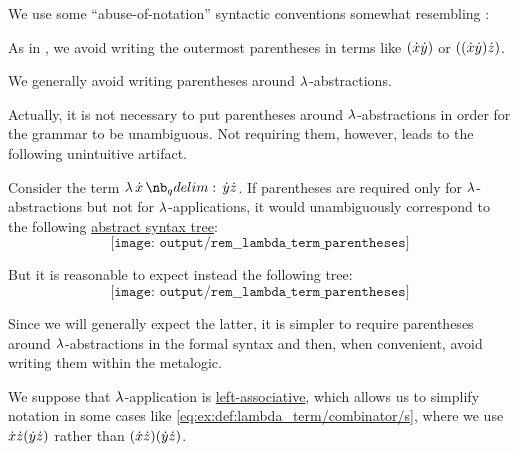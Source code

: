 \begin{remark}\label{rem:lambda_term_parentheses}
  We use some \enquote{abuse-of-notation} syntactic conventions somewhat resembling :
  \begin{thmenum}
     As in , we avoid writing the outermost parentheses in terms like \( ({\dot{x}} {\dot{y}}) \) or \( (({\dot{x}} {\dot{y}}) {\dot{z}}) \).

     We generally avoid writing parentheses around \( \mathrm{\lambda} \)-abstractions.

    Actually, it is not necessary to put parentheses around \( \mathrm{\lambda} \)-abstractions in order for the grammar to be unambiguous. Not requiring them, however, leads to the following unintuitive artifact.

    Consider the term \( \qabs \synx \syny \synz \). If parentheses are required only for \( \mathrm{\lambda} \)-abstractions but not for \( \mathrm{\lambda} \)-applications, it would unambiguously correspond to the following \hyperref[def:lambda_term_ast]{abstract syntax tree}:
    \begin{equation*}
      \texttt{[image: output/rem\_\_lambda\_term\_parentheses]}
    \end{equation*}

    But it is reasonable to expect instead the following tree:
    \begin{equation*}
      \texttt{[image: output/rem\_\_lambda\_term\_parentheses]}
    \end{equation*}

    Since we will generally expect the latter, it is simpler to require parentheses around \( \mathrm{\lambda} \)-abstractions in the formal syntax and then, when convenient, avoid writing them within the metalogic.

     We suppose that \( \mathrm{\lambda} \)-application is \hyperref[rem:binary_operation_syntax_trees/associativity]{left-associative}, which allows us to simplify notation in some cases like \eqref{eq:ex:def:lambda_term/combinator/s}, where we use \( {\dot{x}} {\dot{z}} ({\dot{y}} {\dot{z}}) \) rather than \( ({\dot{x}} {\dot{z}})({\dot{y}} {\dot{z}}) \).
  \end{thmenum}
\end{remark}

